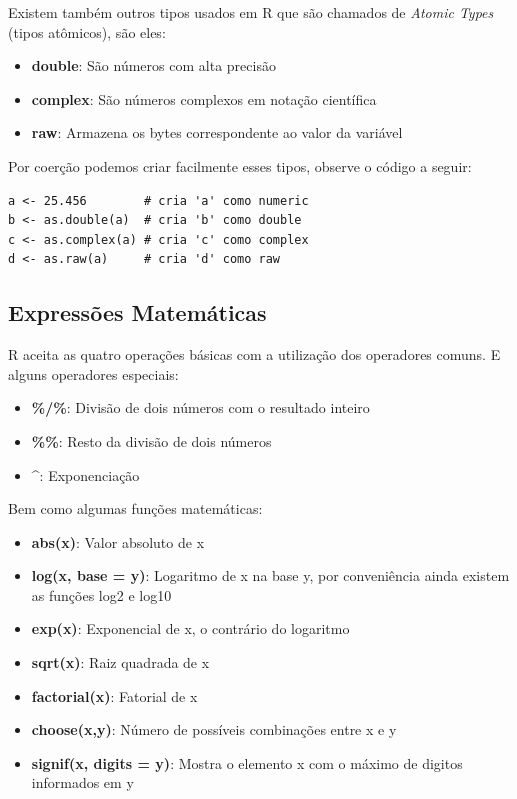 \documentclass[a4paper,11pt]{article}
\begin{document}
Existem também outros tipos usados em R que são chamados de \textit{Atomic Types} (tipos atômicos), são eles:
\begin{itemize}[noitemsep]
  \item \textbf{double}: São números com alta precisão
  \item \textbf{complex}: São números complexos em notação científica
  \item \textbf{raw}: Armazena os bytes correspondente ao valor da variável
\end{itemize}

Por coerção podemos criar facilmente esses tipos, observe o código a seguir:
\begin{lstlisting}
a <- 25.456        # cria 'a' como numeric
b <- as.double(a)  # cria 'b' como double
c <- as.complex(a) # cria 'c' como complex
d <- as.raw(a)     # cria 'd' como raw
\end{lstlisting}

\subsection{Expressões Matemáticas}
R aceita as quatro operações básicas com a utilização dos operadores comuns. E alguns operadores especiais:
\begin{itemize}
  \item \textbf{\%/\%}: Divisão de dois números com o resultado inteiro
  \item \textbf{\%\%}: Resto da divisão de dois números
  \item \textbf{\^}: Exponenciação
\end{itemize}

Bem como algumas funções matemáticas:
\begin{itemize}
  \item \textbf{abs(x)}: Valor absoluto de x
  \item \textbf{log(x, base = y)}: Logaritmo de x na base y, por conveniência ainda existem as funções log2 e log10
  \item \textbf{exp(x)}: Exponencial de x, o contrário do logaritmo
  \item \textbf{sqrt(x)}: Raiz quadrada de x
  \item \textbf{factorial(x)}: Fatorial de x
  \item \textbf{choose(x,y)}: Número de possíveis combinações entre x e y
  \item \textbf{signif(x, digits = y)}: Mostra o elemento x com o máximo de digitos informados em y
\end{itemize}
\end{document}
